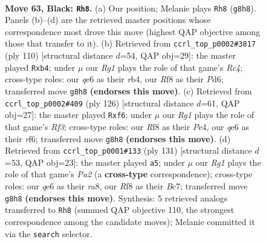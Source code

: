 \documentclass[11pt]{article}
\begin{document}
\clearpage

\begin{figure}[p]\centering
\begin{subfigure}{0.46\textwidth}\centering
\resizebox{\linewidth}{!}{%
\newchessgame
\chessboard[
  setfen={5rr1/p5p1/4Q2p/k2p3P/p2P2P1/1q2P2K/8/4bN2 b - - 35 63},
  showmover=false,
  pgfstyle=straightmove, color=movearrow, markmove={g8-h8}
]}
\caption{}
\end{subfigure}\hfill
\begin{subfigure}{0.46\textwidth}\centering
\resizebox{\linewidth}{!}{%
\newchessgame
\chessboard[
  setfen={8/6pk/3Pp2p/p3Pp2/1rR2P1q/8/2Q3P1/6K1 w - - 8 56},
  showmover=false,
  pgfstyle=straightmove, color=movearrow, markmove={c4-b4}
]}
\caption{}
\end{subfigure}
\\[4pt]
\begin{subfigure}{0.46\textwidth}\centering
\resizebox{\linewidth}{!}{%
\newchessgame
\chessboard[
  setfen={6k1/4qp2/5rp1/1p5p/4P2P/PQ3RP1/5P1K/8 w - - 39 64},
  showmover=false,
  pgfstyle=straightmove, color=movearrow, markmove={f3-f6}
]}
\caption{}
\end{subfigure}\hfill
\begin{subfigure}{0.46\textwidth}\centering
\resizebox{\linewidth}{!}{%
\newchessgame
\chessboard[
  setfen={R7/p1b3rk/2P1q3/4pp2/4p2P/2Q1P1P1/5PNK/8 b - - 4 66},
  showmover=false,
  pgfstyle=straightmove, color=movearrow, markmove={a7-a5}
]}
\caption{}
\end{subfigure}
\caption{\textbf{Move 63, Black: \texttt{Rh8}.} (a) Our position; Melanie plays \texttt{Rh8} (\texttt{g8h8}). Panels (b)--(d) are the retrieved master positions whose correspondence most drove this move (highest QAP objective among those that transfer to it). (b) Retrieved from \texttt{ccrl\_top\_p0002\#3817} (ply 110) [structural distance $d$=54, QAP obj=29]: the master played \texttt{Rxb4}; under $\mu$ our \emph{Rg1} plays the role of that game's \emph{Rc4}; cross-type roles: our \emph{q}e6 as their \emph{r}b4, our \emph{R}f8 as their \emph{P}d6; transferred move \texttt{g8h8} \textbf{(endorses this move)}. (c) Retrieved from \texttt{ccrl\_top\_p0002\#409} (ply 126) [structural distance $d$=61, QAP obj=27]: the master played \texttt{Rxf6}; under $\mu$ our \emph{Rg1} plays the role of that game's \emph{Rf3}; cross-type roles: our \emph{R}f8 as their \emph{P}e4, our \emph{q}e6 as their \emph{r}f6; transferred move \texttt{g8h8} \textbf{(endorses this move)}. (d) Retrieved from \texttt{ccrl\_top\_p0001\#133} (ply 131) [structural distance $d$=53, QAP obj=23]: the master played \texttt{a5}; under $\mu$ our \emph{Rg1} plays the role of that game's \emph{Pa2} (a \textbf{cross-type} correspondence); cross-type roles: our \emph{q}e6 as their \emph{r}a8, our \emph{R}f8 as their \emph{B}c7; transferred move \texttt{g8h8} \textbf{(endorses this move)}. Synthesis: 5 retrieved analogs transferred to \texttt{Rh8} (summed QAP objective 110, the strongest correspondence among the candidate moves); Melanie committed it via the \texttt{search} selector.}
\label{fig:thought-m125}
\end{figure}
\end{document}
